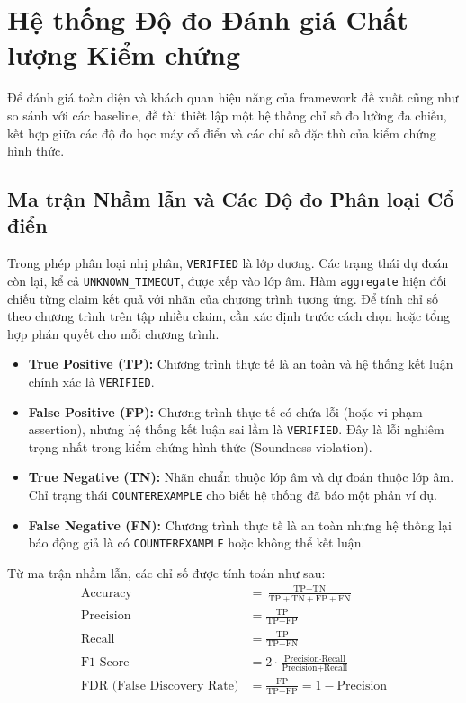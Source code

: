 \section{Hệ thống Độ đo Đánh giá Chất lượng Kiểm chứng}
\label{sec:metrics_definition}

Để đánh giá toàn diện và khách quan hiệu năng của framework đề xuất cũng như so sánh với các baseline, đề tài thiết lập một hệ thống chỉ số đo lường đa chiều, kết hợp giữa các độ đo học máy cổ điển và các chỉ số đặc thù của kiểm chứng hình thức.

\subsection{Ma trận Nhầm lẫn và Các Độ đo Phân loại Cổ điển}
Trong phép phân loại nhị phân, \texttt{VERIFIED} là lớp dương. Các trạng thái dự đoán còn lại, kể cả \texttt{UNKNOWN\_TIMEOUT}, được xếp vào lớp âm. Hàm \texttt{aggregate} hiện đối chiếu từng claim kết quả với nhãn của chương trình tương ứng. Để tính chỉ số theo chương trình trên tập nhiều claim, cần xác định trước cách chọn hoặc tổng hợp phán quyết cho mỗi chương trình.
\begin{itemize}
    \item \textbf{True Positive (TP):} Chương trình thực tế là an toàn và hệ thống kết luận chính xác là \texttt{VERIFIED}.
    \item \textbf{False Positive (FP):} Chương trình thực tế có chứa lỗi (hoặc vi phạm assertion), nhưng hệ thống kết luận sai lầm là \texttt{VERIFIED}. Đây là lỗi nghiêm trọng nhất trong kiểm chứng hình thức (Soundness violation).
    \item \textbf{True Negative (TN):} Nhãn chuẩn thuộc lớp âm và dự đoán thuộc lớp âm. Chỉ trạng thái \texttt{COUNTEREXAMPLE} cho biết hệ thống đã báo một phản ví dụ.
    \item \textbf{False Negative (FN):} Chương trình thực tế là an toàn nhưng hệ thống lại báo động giả là có \texttt{COUNTEREXAMPLE} hoặc không thể kết luận.
\end{itemize}

Từ ma trận nhầm lẫn, các chỉ số được tính toán như sau:
\begin{align}
\text{Accuracy} &= \frac{\text{TP} + \text{TN}}{\text{TP} + \text{TN} + \text{FP} + \text{FN}} \\
\text{Precision} &= \frac{\text{TP}}{\text{TP} + \text{FP}} \\
\text{Recall} &= \frac{\text{TP}}{\text{TP} + \text{FN}} \\
\text{F1-Score} &= 2 \cdot \frac{\text{Precision} \cdot \text{Recall}}{\text{Precision} + \text{Recall}} \\
\text{FDR (False Discovery Rate)} &= \frac{\text{FP}}{\text{TP} + \text{FP}} = 1 - \text{Precision}
\end{align}

